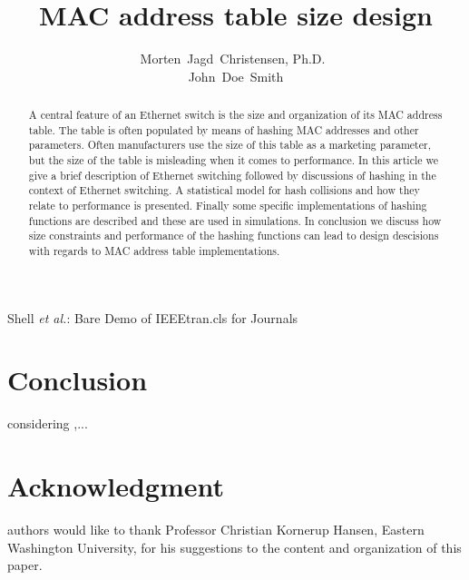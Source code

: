 \documentclass[journal]{IEEEtran}
\begin{document}
%


\title{MAC address table size design}

\author{Morten~Jagd~Christensen, Ph.D.~%

John~Doe~Smith
}

%
{Shell \MakeLowercase{\textit{et al.}}: Bare Demo of IEEEtran.cls for Journals}

\maketitle

\begin{abstract}
A central feature of an Ethernet switch is the size and organization of its MAC address table. The table 
is often populated by means of hashing MAC addresses and other parameters. Often manufacturers 
use the size of this table as a marketing parameter, but the size of the table is misleading when it comes to
performance.
In this article we give a brief description of Ethernet switching followed by discussions of hashing in the context of 
Ethernet switching. A statistical model for hash collisions and how they relate to performance is presented.
Finally some specific implementations of hashing functions are described and these are used 
in simulations.  In conclusion we discuss how size constraints and performance of the hashing functions 
can lead to design descisions with regards to MAC address table implementations.
\end{abstract}









\section{Conclusion}
considering ,...


\section*{Acknowledgment}
authors would like to thank Professor Christian Kornerup Hansen, Eastern Washington University, for his
suggestions to the content and organization of this paper.



\end{document}
